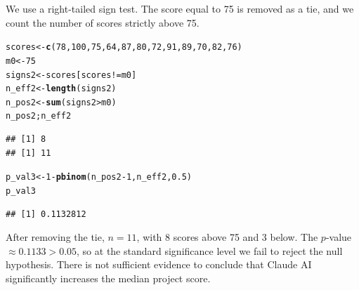 \documentclass[12pt,english]{article}\usepackage[]{graphicx}\usepackage[]{xcolor}
\makeatletter
\newcommand{\hlnum}[1]{\textcolor[rgb]{0.686,0.059,0.569}{#1}}%
\newcommand{\hlopt}[1]{\textcolor[rgb]{0,0,0}{#1}}%
\newcommand{\hldef}[1]{\textcolor[rgb]{0.345,0.345,0.345}{#1}}%
\newcommand{\hlkwb}[1]{\textcolor[rgb]{0.69,0.353,0.396}{#1}}%
\newcommand{\hlkwd}[1]{\textcolor[rgb]{0.737,0.353,0.396}{\textbf{#1}}}%
\newenvironment{kframe}{%
 \def\at@end@of@kframe{}%
 \ifinner\ifhmode%
  \def\at@end@of@kframe{\end{minipage}}%
  \begin{minipage}{\columnwidth}%
 \fi\fi%
 \def\FrameCommand##1{\hskip\@totalleftmargin \hskip-\fboxsep
 \colorbox{shadecolor}{##1}\hskip-\fboxsep
     \hskip-\linewidth \hskip-\@totalleftmargin \hskip\columnwidth}%
 \MakeFramed {\advance\hsize-\width
   \@totalleftmargin\z@ \linewidth\hsize
   \@setminipage}}%
 {\par\unskip\endMakeFramed%
 \at@end@of@kframe}
\newenvironment{knitrout}{}{} %
\makeatother
\begin{document}
\begin{enumerate}[label=\arabic*.]
	We use a right-tailed sign test. The score equal to 75 is removed as a tie, and we count the number of scores strictly above 75.
\begin{knitrout}
\color{fgcolor}\begin{kframe}
\begin{alltt}
\hldef{scores} \hlkwb{<-} \hlkwd{c}\hldef{(}\hlnum{78}\hldef{,}\hlnum{100}\hldef{,}\hlnum{75}\hldef{,}\hlnum{64}\hldef{,}\hlnum{87}\hldef{,}\hlnum{80}\hldef{,}\hlnum{72}\hldef{,}\hlnum{91}\hldef{,}\hlnum{89}\hldef{,}\hlnum{70}\hldef{,}\hlnum{82}\hldef{,}\hlnum{76}\hldef{)}
\hldef{m0} \hlkwb{<-} \hlnum{75}
\hldef{signs2} \hlkwb{<-} \hldef{scores[scores} \hlopt{!=} \hldef{m0]}
\hldef{n_eff2} \hlkwb{<-} \hlkwd{length}\hldef{(signs2)}
\hldef{n_pos2} \hlkwb{<-} \hlkwd{sum}\hldef{(signs2} \hlopt{>} \hldef{m0)}
\hldef{n_pos2; n_eff2}
\end{alltt}
\begin{verbatim}
## [1] 8
## [1] 11
\end{verbatim}
\begin{alltt}
\hldef{p_val3} \hlkwb{<-} \hlnum{1} \hlopt{-} \hlkwd{pbinom}\hldef{(n_pos2} \hlopt{-} \hlnum{1}\hldef{, n_eff2,} \hlnum{0.5}\hldef{)}
\hldef{p_val3}
\end{alltt}
\begin{verbatim}
## [1] 0.1132812
\end{verbatim}
\end{kframe}
\end{knitrout}
	After removing the tie, $n = 11$, with 8 scores above 75 and 3 below. The $p$-value $\approx 0.1133 > 0.05$, so at the standard significance level we fail to reject the null hypothesis. There is not sufficient evidence to conclude that Claude AI significantly increases the median project score.

\end{enumerate}
\end{document}
